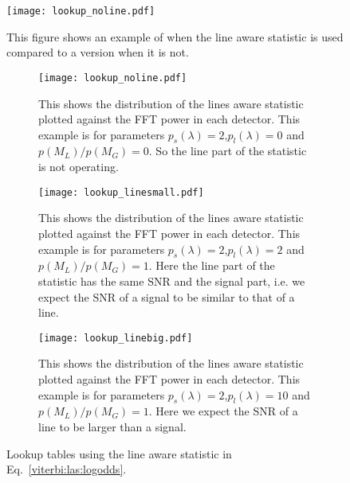 \begin{figure}
    \centering
    \texttt{[image: lookup\_noline.pdf]}
    \caption{This figure shows an example of when the line aware statistic is used compared to a version when it is not.}
    \label{fig:my_label}
\end{figure}

\begin{figure}[h]
\centering

\begin{subfigure}[h]{\linewidth}
\begin{minipage}{0.65\linewidth}
\texttt{[image: lookup\_noline.pdf]}
\end{minipage}\hfill
\begin{minipage}{0.35\linewidth}
\caption{This shows the distribution of the lines aware statistic plotted against the \ac{FFT} power in each detector. This example is for parameters $p_s(\lambda) = 2$,$p_l(\lambda) = 0$ and $p(M_L)/p(M_G) = 0$. So the line part of the statistic is not operating.}
\label{viterbi:plot:data}
\end{minipage}
\end{subfigure}

\begin{subfigure}[h]{\linewidth}
\begin{minipage}{0.65\linewidth}
\texttt{[image: lookup\_linesmall.pdf]}
\end{minipage}\hfill
\begin{minipage}{0.35\linewidth}
\caption{This shows the distribution of the lines aware statistic plotted against the \ac{FFT} power in each detector. This example is for parameters $p_s(\lambda) = 2$,$p_l(\lambda) = 2$ and $p(M_L)/p(M_G) = 1$. Here the line part of the statistic has the same \ac{SNR} and the signal part, i.e. we expect the \ac{SNR} of a signal to be similar to that of a line.}
\label{viterbi:plot:data}
\end{minipage}
\end{subfigure}

\begin{subfigure}[h]{\linewidth}
\begin{minipage}{0.65\linewidth}
\texttt{[image: lookup\_linebig.pdf]}
\end{minipage}\hfill
\begin{minipage}{0.35\linewidth}
\caption{This shows the distribution of the lines aware statistic plotted against the \ac{FFT} power in each detector. This example is for parameters $p_s(\lambda) = 2$,$p_l(\lambda) = 10$ and $p(M_L)/p(M_G) = 1$. Here we expect the \ac{SNR} of a line to be larger than a signal.}
\label{viterbi:plot:data}
\end{minipage}
\end{subfigure}
\caption{Lookup tables using the line aware statistic in Eq.~\ref{viterbi:las:logodds}.}
\label{viterbi:las:osgl_plots}
\end{figure}


